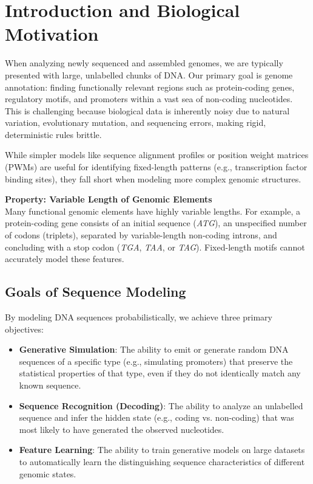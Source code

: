 

\section{Introduction and Biological Motivation}

When analyzing newly sequenced and assembled genomes, we are typically presented with large, unlabelled chunks of DNA. Our primary goal is genome annotation: finding functionally relevant regions such as protein-coding genes, regulatory motifs, and promoters within a vast sea of non-coding nucleotides. This is challenging because biological data is inherently noisy due to natural variation, evolutionary mutation, and sequencing errors, making rigid, deterministic rules brittle.

While simpler models like sequence alignment profiles or position weight matrices (PWMs) are useful for identifying fixed-length patterns (e.g., transcription factor binding sites), they fall short when modeling more complex genomic structures.

\begin{important}
  \textbf{Property: Variable Length of Genomic Elements} \\
  Many functional genomic elements have highly variable lengths. For example, a protein-coding gene consists of an initial sequence (\textit{ATG}), an unspecified number of codons (triplets), separated by variable-length non-coding introns, and concluding with a stop codon (\textit{TGA}, \textit{TAA}, or \textit{TAG}). Fixed-length motifs cannot accurately model these features.
\end{important}

\subsection{Goals of Sequence Modeling}
By modeling DNA sequences probabilistically, we achieve three primary objectives:
\begin{itemize}
    \item \textbf{Generative Simulation}: The ability to emit or generate random DNA sequences of a specific type (e.g., simulating promoters) that preserve the statistical properties of that type, even if they do not identically match any known sequence.
    \item \textbf{Sequence Recognition (Decoding)}: The ability to analyze an unlabelled sequence and infer the hidden state (e.g., coding vs. non-coding) that was most likely to have generated the observed nucleotides.
    \item \textbf{Feature Learning}: The ability to train generative models on large datasets to automatically learn the distinguishing sequence characteristics of different genomic states.
\end{itemize}

